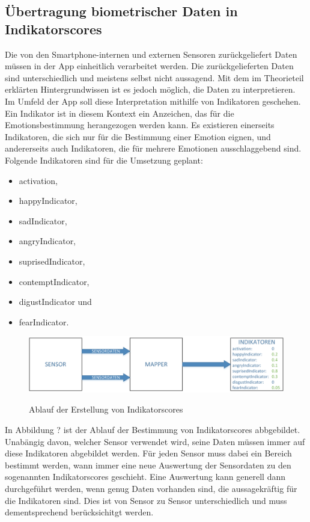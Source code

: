 \subsection{Übertragung biometrischer Daten in Indikatorscores}
Die von den Smartphone-internen und externen Sensoren zurückgeliefert Daten müssen in der App einheitlich verarbeitet werden. Die zurückgelieferten Daten sind unterschiedlich und meistens selbst nicht aussagend. Mit dem im Theorieteil erklärten Hintergrundwissen ist es jedoch möglich, die Daten zu interpretieren. \newline 
Im Umfeld der App soll diese Interpretation mithilfe von Indikatoren geschehen. Ein Indikator ist in diesem Kontext ein Anzeichen, das für die Emotionsbestimmung herangezogen werden kann. Es existieren einerseits Indikatoren, die sich nur für die Bestimmung einer Emotion eignen, und andererseits auch Indikatoren, die für mehrere Emotionen ausschlaggebend sind. Folgende Indikatoren sind für die Umsetzung geplant: 
\begin{itemize}[noitemsep, topsep=0pt]
	\item activation,
	\item happyIndicator,
	\item sadIndicator,
    \item angryIndicator,
    \item suprisedIndicator,
    \item contemptIndicator,
    \item digustIndicator und
    \item fearIndicator.
\end{itemize}
\begin{figure}[h]
	\centering
	\includegraphics[width=16cm]{Bilder/indicatorscore.png}
	\label{img:Ablauf Erstellung Indicatorscores}
	\caption[Ablauf der Erstellung von Indikatorscores]{Ablauf der Erstellung von Indikatorscores}
\end{figure}%
In Abbildung ? ist der Ablauf der Bestimmung von Indikatorscores abbgebildet. Unabängig davon, welcher Sensor verwendet wird, seine Daten müssen immer auf diese Indikatoren abgebildet werden. Für jeden Sensor muss dabei ein Bereich bestimmt werden, wann immer eine neue Auswertung der Sensordaten zu den sogenannten Indikatorscores geschieht. Eine Auswertung kann generell dann durchgeführt werden, wenn genug Daten vorhanden sind, die aussagekräftig für die Indikatoren sind. Dies ist von Sensor zu Sensor unterschiedlich und muss dementsprechend berücksichitgt werden. \newline
